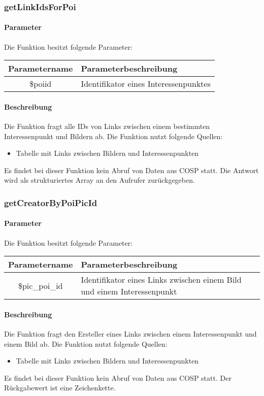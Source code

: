 \subsubsection{getLinkIdsForPoi}
\paragraph{Parameter} Die Funktion besitzt folgende Parameter:
\begin{table}[H]
	\begin{tabular}{|c|p{11cm}|}
		\hline
		\textbf{Parametername} & \textbf{Parameterbeschreibung} \\ \hline
		\$poiid & Identifikator eines Interessenpunktes \\ \hline
	\end{tabular}
\end{table}
\paragraph{Beschreibung} Die Funktion fragt alle IDs von Links zwischen einem bestimmten Interessenpunkt und Bildern ab. Die Funktion nutzt folgende Quellen:
\begin{itemize}
	\item Tabelle mit Links zwischen Bildern und Interessenpunkten
\end{itemize}
Es findet bei dieser Funktion kein Abruf von Daten aus {\glqq COSP\grqq} statt. Die Antwort wird als strukturiertes Array an den Aufrufer zurückgegeben.
\subsubsection{getCreatorByPoiPicId}
\paragraph{Parameter} Die Funktion besitzt folgende Parameter:
\begin{table}[H]
	\begin{tabular}{|c|p{11cm}|}
		\hline
		\textbf{Parametername} & \textbf{Parameterbeschreibung} \\ \hline
		\$pic\_poi\_id & Identifikator eines Links zwischen einem Bild und einem Interessenpunkt \\ \hline
	\end{tabular}
\end{table}
\paragraph{Beschreibung} Die Funktion fragt den Ersteller eines Links zwischen einem Interessenpunkt und einem Bild ab. Die Funktion nutzt folgende Quellen:
\begin{itemize}
	\item Tabelle mit Links zwischen Bildern und Interessenpunkten
\end{itemize}
Es findet bei dieser Funktion kein Abruf von Daten aus {\glqq COSP\grqq} statt. Der Rückgabewert ist eine Zeichenkette.
